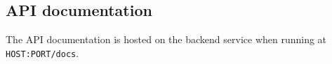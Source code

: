 \subsection{API documentation} \label{apidocs}
The API documentation is hosted on the backend service when running at \texttt{HOST:PORT/docs}.
